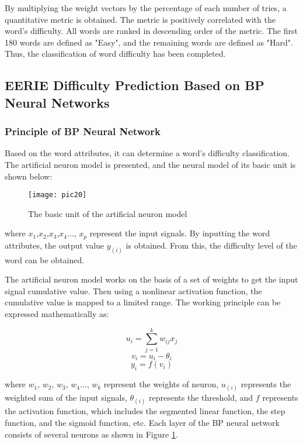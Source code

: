 \documentclass[12pt]{article}  %
\begin{document}
By multiplying the weight vectors by the percentage of each number of tries, a quantitative metric is obtained. The metric is positively correlated with the word's difficulty. All words are ranked in descending order of the metric. The first 180 words are defined as "Easy", and the remaining words are defined as "Hard". Thus, the classification of word difficulty has been completed.

\subsection{EERIE Difficulty Prediction Based on BP Neural Networks}
\subsubsection{Principle of BP Neural Network}
Based on the word attributes, it can determine a word's difficulty classification. The artificial neuron model is presented, and the neural model of its basic unit is shown below:

\begin{figure}[htbp]  %
	\centering  %
	\texttt{[image: pic20]} %
	\caption{The basic unit of the artificial neuron model}  
	\label{pic20}
\end{figure}

where $x_1$,$x_2$,$x_3$,$x_4$..., $x_p$ represent the input signals. By inputting the word attributes, the output value $y_{(i)}$ is obtained. From this, the difficulty level of the word can be obtained.

The artificial neuron model works on the basis of a set of weights to get the input signal cumulative value. Then using a nonlinear activation function, the cumulative value is mapped to a limited range. The working principle can be expressed mathematically as:

\begin{equation}
	u_i=\sum_{j=1}^k w_{i j} x_j
\end{equation}
\begin{equation}
	v_i=u_i-\theta_i
\end{equation}
\begin{equation}
	y_i=f\left(v_i\right)
\end{equation}

where $w_1$, $w_2$, $w_3$, $w_4$..., $w_k$ represent the weights of neuron, $u_{(i)}$ represents the weighted sum of the input signals, $\theta_{(i)}$ represents the threshold, and $f$ represents the activation function, which includes the segmented linear function, the step function, and the sigmoid function, etc. Each layer of the BP neural network consists of several neurons as shown in Figure \ref{pic20}.
\end{document}
